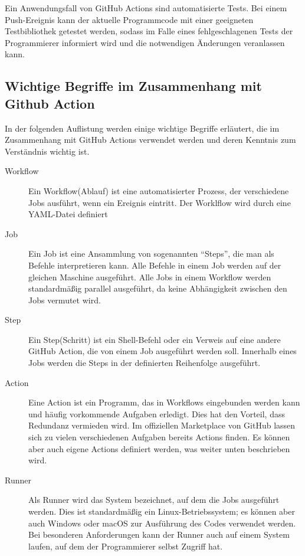 Ein Anwendungsfall von GitHub Actions sind automatisierte Tests. Bei einem Push-Ereignis kann der aktuelle Programmcode mit einer geeigneten Testbibliothek getestet werden, sodass im Falle eines fehlgeschlagenen Tests der Programmierer informiert wird und die notwendigen Änderungen veranlassen kann. 

\subsection{Wichtige Begriffe im Zusammenhang mit Github Action}
In der folgenden Auflistung werden einige wichtige Begriffe erläutert, die im Zusammenhang mit GitHub Actions verwendet werden und deren Kenntnis zum Verständnis wichtig ist. 
\begin{description}
    \item[Workflow] Ein Workflow(Ablauf) ist eine automatisierter Prozess, der verschiedene Jobs ausführt, wenn ein Ereignis eintritt. Der Worklflow wird durch eine YAML-Datei definiert
    \item[Job] Ein Job ist eine Ansammlung von sogenannten \enquote{Steps}, die man als Befehle interpretieren kann. Alle Befehle in einem Job werden auf der gleichen Maschine ausgeführt. Alle Jobs in einem Workflow werden standardmäßig parallel ausgeführt, da keine Abhängigkeit zwischen den Jobs vermutet wird.
    \item[Step] Ein Step(Schritt) ist ein Shell-Befehl oder ein Verweis auf eine andere GitHub Action, die von einem Job ausgeführt werden soll. Innerhalb eines Jobs werden die Steps in der definierten Reihenfolge ausgeführt. 
    \item[Action] Eine Action ist ein Programm, das in Workflows eingebunden werden kann und häufig vorkommende Aufgaben erledigt. Dies hat den Vorteil, dass Redundanz vermieden wird. Im offiziellen Marketplace von GitHub lassen sich zu vielen verschiedenen Aufgaben bereits Actions finden. Es können aber auch eigene Actions definiert werden, was weiter unten beschrieben wird. 
    \item[Runner] Als Runner wird das System bezeichnet, auf dem die Jobs ausgeführt werden. Dies ist standardmäßig ein Linux-Betriebssystem; es können aber auch Windows oder macOS zur Ausführung des Codes verwendet werden. Bei besonderen Anforderungen kann der Runner auch auf einem System laufen, auf dem der Programmierer selbst Zugriff hat.
\end{description}
